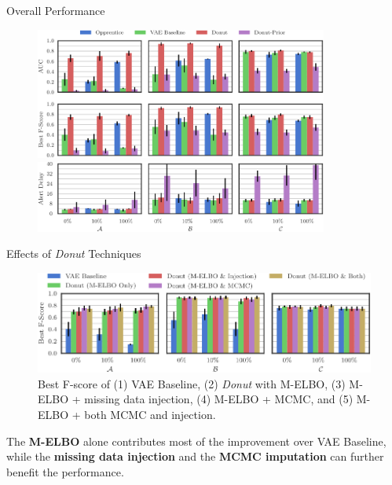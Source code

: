 \documentclass[usenames,dvipsnames]{beamer}
\newcommand{\DONUT}{\textit{Donut}}
\newcommand{\emphasis}[1]{\textbf{\textcolor{emphcolor}{#1}}}
\begin{document}
\begin{frame}{Overall Performance}
  \begin{figure}
    \centering
    \includegraphics[height=11.7em]{overall_perf}\\\vspace{.6em}
    \includegraphics[height=6.35em]{delay_perf}
  \end{figure}
\end{frame}

\begin{frame}{Effects of \DONUT{} Techniques}
  \begin{figure}
    \centering
    \includegraphics[height=.39\textheight]{tricks_perf}
    \caption{
		Best F-score of (1) VAE Baseline, (2) \DONUT{} with M-ELBO, (3) M-ELBO + missing data injection, (4) M-ELBO + MCMC, and (5) M-ELBO + both MCMC and injection.
    }
  \end{figure}\vspace{-1em}
  
  The \emphasis{M-ELBO} alone contributes most of the improvement over VAE Baseline, while the \emphasis{missing data injection} and the \emphasis{MCMC imputation} can further benefit the performance.
\end{frame}
\end{document}

